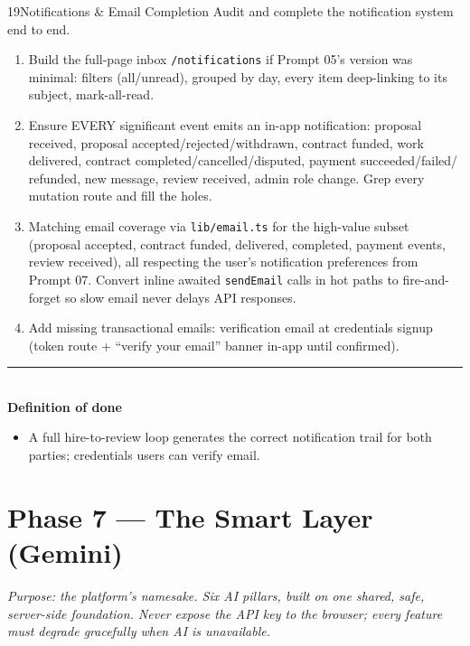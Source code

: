 \documentclass[11pt,a4paper]{article}
\newcommand{\dod}{\medskip\noindent\textcolor{donegreen}{\rule{\linewidth}{0.5pt}}\\[1mm]\textbf{\textcolor{donegreen}{Definition of done}}\\[-2mm]}
\newcommand{\filepath}[1]{\texttt{#1}}
\begin{document}
\begin{promptbox}{19}{Notifications \& Email Completion}
Audit and complete the notification system end to end.

\begin{enumerate}[leftmargin=1.6em]
  \item Build the full-page inbox \texttt{/notifications} if Prompt 05's version was
        minimal: filters (all/unread), grouped by day, every item deep-linking to its
        subject, mark-all-read.
  \item Ensure EVERY significant event emits an in-app notification: proposal
        received, proposal accepted/rejected/withdrawn, contract funded, work
        delivered, contract completed/cancelled/disputed, payment succeeded/failed/
        refunded, new message, review received, admin role change. Grep every mutation
        route and fill the holes.
  \item Matching email coverage via \filepath{lib/email.ts} for the high-value subset
        (proposal accepted, contract funded, delivered, completed, payment events,
        review received), all respecting the user's notification preferences from
        Prompt 07. Convert inline awaited \texttt{sendEmail} calls in hot paths to
        fire-and-forget so slow email never delays API responses.
  \item Add missing transactional emails: verification email at credentials signup
        (token route + ``verify your email'' banner in-app until confirmed).
\end{enumerate}

\dod
\begin{itemize}[leftmargin=1.6em]
  \item A full hire-to-review loop generates the correct notification trail for both
        parties; credentials users can verify email.
\end{itemize}
\end{promptbox}

\section{Phase 7 --- The Smart Layer (Gemini)}

\textit{Purpose: the platform's namesake. Six AI pillars, built on one shared,
safe, server-side foundation. Never expose the API key to the browser; every
feature must degrade gracefully when AI is unavailable.}
\end{document}
